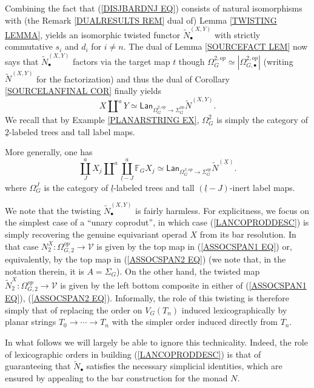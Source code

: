 \documentclass[a4paper,10pt]{article}%
\begin{document}
Combining the fact that (\ref{DISJBARDNJ EQ}) consists of natural isomorphisms with (the Remark \ref{DUALRESULTS REM} dual of) Lemma \ref{TWISTING LEMMA}, yields an isomorphic twisted functor $\tilde{N}_{\bullet}^{(X,Y)}$ with strictly commutative $s_i$ and $d_i$ for $i \neq n$. The dual of Lemma \ref{SOURCEFACT LEM} now says that $\tilde{N}_{\bullet}^{(X,Y)}$ factors via the target map $t$ though 
$\Omega_G^{\underline{2},op} \simeq
 |\Omega_{G,\bullet}^{\underline{2},op}|$
(writing $\tilde{N}^{(X,Y)}$ for the factorization)
and thus the dual of 
Corollary \ref{SOURCELANFINAL COR}
finally yields
\begin{equation}
	X \amalg^a Y \simeq 
	\mathsf{Lan}_{\Omega_{G}^{\underline{2},op} \to \Sigma_G^{op}}
	\tilde{N}^{(X,Y)}.
\end{equation}
We recall that by Example \ref{PLANARSTRING EX}, $\Omega_{G}^{\underline{2}}$ is simply the category of $\underline{2}$-labeled trees and tall label maps.

More generally, one has 
\begin{equation}\label{LANCOPRODDESC}
	\coprod^a_{J} X_j \amalg^a \coprod^a_{\underline{l}-J}
	\mathbb{F}_G X_j \simeq 
	\mathsf{Lan}_{\Omega_{G}^{J,op} \to \Sigma_G^{op}}
	\tilde{N}^{(\underline{X})}.
\end{equation}
where $\Omega_{G}^{J}$ is the category of $\underline{l}$-labeled trees and tall $(\underline{l}-J)$-inert label maps.


\begin{remark}
We note that the twisting $\tilde{N}_{\bullet}^{(X,Y)}$ is fairly harmless. 
For explicitness, we focus on the simplest case of a ``unary coprodut'', in which case (\ref{LANCOPRODDESC})
is simply recovering the genuine equivariant operad $X$ from its bar resolution. 
In that case $N^X_2 \colon \Omega_{G,2}^{op} \to \mathcal{V}$
is given by the top map in 
(\ref{ASSOCSPAN1 EQ}) or, equivalently, by the top map in 
(\ref{ASSOCSPAN2 EQ}) (we note that, in the notation therein, it is $A=\Sigma_G$). On the other hand, the twisted map
$\tilde{N}^X_2 \colon \Omega_{G,2}^{op} \to \mathcal{V}$
is given by the left bottom composite in either of (\ref{ASSOCSPAN1 EQ}), (\ref{ASSOCSPAN2 EQ}).
Informally, the role of this twisting is therefore simply that of replacing the order on $V_G(T_n)$ induced lexicographically by planar strings 
$T_0 \to \cdots \to T_n$
with the simpler order induced directly from $T_n$.

In what follows we will largely be able to ignore this technicality. Indeed, the role of lexicographic orders
in building (\ref{LANCOPRODDESC}) is that of guaranteeing that 
$\tilde{N}_{\bullet}$ satisfies the necessary simplicial identities, which are ensured by appealing to the bar construction for the monad $N$.
\end{remark}
\end{document}
